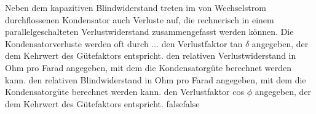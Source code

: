    {Neben dem kapazitiven Blindwiderstand treten im von Wechselstrom durchflossenen Kondensator auch Verluste auf, die rechnerisch in einem parallelgeschalteten Verlustwiderstand zusammengefasst werden können. Die Kondensatorverluste werden oft durch ...}
    {den Verlustfaktor tan $\delta$ angegeben, der dem Kehrwert des Gütefaktors entspricht.}
    {den relativen Verlustwiderstand in Ohm pro Farad angegeben, mit dem die Kondensatorgüte berechnet werden kann.}
    {den relativen Blindwiderstand in Ohm pro Farad angegeben, mit dem die Kondensatorgüte berechnet werden kann.}
    {den Verlustfaktor cos $\phi$ angegeben, der dem Kehrwert des Gütefaktors entspricht.}
    {false}{false}